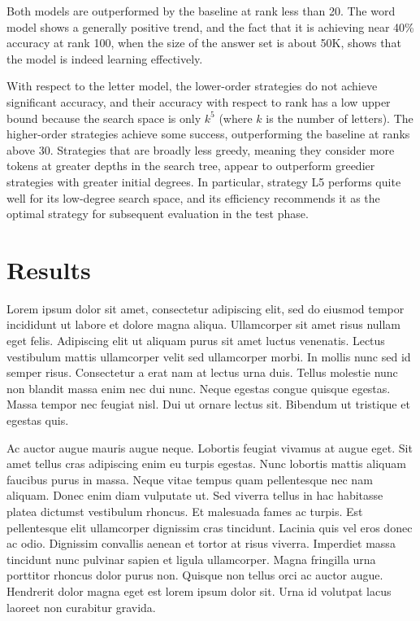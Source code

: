 \documentclass[letterpaper]{article} %
\begin{document}
\begin{NoHyper}
Both models are outperformed by the baseline at rank less than 20.
The word model shows a generally positive trend, and the fact that it is achieving near 40\% accuracy at rank 100, when the size of the answer set is about 50K, shows that the model is indeed learning effectively.

With respect to the letter model, the lower-order strategies do not achieve significant accuracy, and their accuracy with respect to rank has a low upper bound because the search space is only $k^5$ (where $k$ is the number of letters).
The higher-order strategies achieve some success,  outperforming the baseline at ranks above 30.
Strategies that are broadly less greedy, meaning they consider more tokens at greater depths in the search tree, appear to outperform greedier strategies with greater initial degrees.
In particular, strategy L5 performs quite well for its low-degree search space, and its efficiency recommends it as the optimal strategy for subsequent evaluation in the test phase.



\section{Results}
\label{sec:results}

Lorem ipsum dolor sit amet, consectetur adipiscing elit, sed do eiusmod tempor incididunt ut labore et dolore magna aliqua.
Ullamcorper sit amet risus nullam eget felis.
Adipiscing elit ut aliquam purus sit amet luctus venenatis.
Lectus vestibulum mattis ullamcorper velit sed ullamcorper morbi.
In mollis nunc sed id semper risus.
Consectetur a erat nam at lectus urna duis.
Tellus molestie nunc non blandit massa enim nec dui nunc.
Neque egestas congue quisque egestas.
Massa tempor nec feugiat nisl.
Dui ut ornare lectus sit.
Bibendum ut tristique et egestas quis.

Ac auctor augue mauris augue neque.
Lobortis feugiat vivamus at augue eget.
Sit amet tellus cras adipiscing enim eu turpis egestas.
Nunc lobortis mattis aliquam faucibus purus in massa.
Neque vitae tempus quam pellentesque nec nam aliquam.
Donec enim diam vulputate ut.
Sed viverra tellus in hac habitasse platea dictumst vestibulum rhoncus.
Et malesuada fames ac turpis.
Est pellentesque elit ullamcorper dignissim cras tincidunt.
Lacinia quis vel eros donec ac odio.
Dignissim convallis aenean et tortor at risus viverra.
Imperdiet massa tincidunt nunc pulvinar sapien et ligula ullamcorper.
Magna fringilla urna porttitor rhoncus dolor purus non.
Quisque non tellus orci ac auctor augue.
Hendrerit dolor magna eget est lorem ipsum dolor sit.
Urna id volutpat lacus laoreet non curabitur gravida.


\end{NoHyper}
\end{document}

